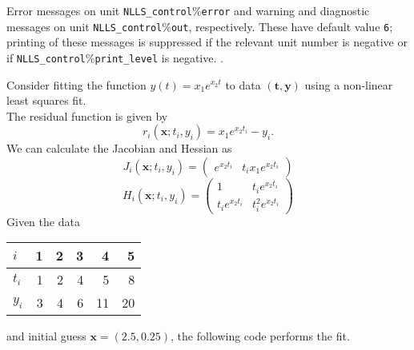 \documentclass{spec}
\newcommand{\vx}{ {\bm x} } %
\begin{document}
\hslgeneral


\hslio 
   Error messages on unit {\tt NLLS\_control$\%$error} and warning
   and diagnostic messages on unit {\tt NLLS\_control$\%$out},
   respectively. These have default value {\tt 6};
   printing of these messages is suppressed if the relevant unit number
   is negative or if {\tt NLLS\_control$\%$print\_level} is negative.
.

\hslmethod 
\label{method}


\hslexample
Consider fitting the function $y(t) = x_1e^{x_2 t}$ to data $(\bm{t}, \bm{y})$
using a non-linear least squares fit.\\
The residual function is given by
$$
   r_i(\vx; t_i, y_i) = x_1 e^{x_2 t_i} - y_i.
$$
We can calculate the Jacobian and Hessian as
$$
   J_i(\vx; t_i, y_i) = \left(\begin{array}{cc}
      e^{x_2 t_i} &
      t_i x_1 e^{x_2 t_i}
      \end{array}\right)
$$
$$
   H_i(\vx; t_i, y_i) = \left(\begin{array}{cc}
      1                 & t_i e^{x_2 t_i}    \\
      t_i e^{x_2 t_i}   & t_i^2 e^{x_2 t_i}
   \end{array}\right)
$$
Given the data
\begin{center}
   \begin{tabular}{l|*{5}{r}}
      $i$   & 1 & 2 & 3  & 4  & 5 \\
      \hline
      $t_i$ & 1 & 2 & 4  & 5  & 8 \\
      $y_i$ & 3 & 4 & 6 & 11 & 20
   \end{tabular}
\end{center}
and initial guess $\vx = (2.5, 0.25)$, the following code performs the fit.


\end{document}
